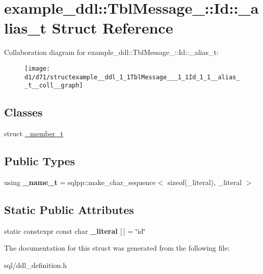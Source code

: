 \hypertarget{structexample__ddl_1_1TblMessage___1_1Id_1_1__alias__t}{}\section{example\+\_\+ddl\+:\+:Tbl\+Message\+\_\+\+:\+:Id\+:\+:\+\_\+alias\+\_\+t Struct Reference}
\label{structexample__ddl_1_1TblMessage___1_1Id_1_1__alias__t}


Collaboration diagram for example\+\_\+ddl\+:\+:Tbl\+Message\+\_\+\+:\+:Id\+:\+:\+\_\+alias\+\_\+t\+:
\nopagebreak
\begin{figure}[H]
\begin{center}
\leavevmode
\texttt{[image: d1/d71/structexample\_\_ddl\_1\_1TblMessage\_\_\_1\_1Id\_1\_1\_\_alias\_\_t\_\_coll\_\_graph]}
\end{center}
\end{figure}
\subsection*{Classes}
\begin{DoxyCompactItemize}
\item 
struct \hyperlink{structexample__ddl_1_1TblMessage___1_1Id_1_1__alias__t_1_1__member__t}{\+\_\+member\+\_\+t}
\end{DoxyCompactItemize}
\subsection*{Public Types}
\begin{DoxyCompactItemize}
\item 
\hypertarget{structexample__ddl_1_1TblMessage___1_1Id_1_1__alias__t_a7e476aec0631ba979110d3fe06055aec}{}using {\bfseries \+\_\+name\+\_\+t} = sqlpp\+::make\+\_\+char\+\_\+sequence$<$ sizeof(\+\_\+literal), \+\_\+literal $>$\label{structexample__ddl_1_1TblMessage___1_1Id_1_1__alias__t_a7e476aec0631ba979110d3fe06055aec}

\end{DoxyCompactItemize}
\subsection*{Static Public Attributes}
\begin{DoxyCompactItemize}
\item 
\hypertarget{structexample__ddl_1_1TblMessage___1_1Id_1_1__alias__t_a97665c2183a59b153d12c4b28d0a354c}{}static constexpr const char {\bfseries \+\_\+literal} \mbox{[}$\,$\mbox{]} = \char`\"{}id\char`\"{}\label{structexample__ddl_1_1TblMessage___1_1Id_1_1__alias__t_a97665c2183a59b153d12c4b28d0a354c}

\end{DoxyCompactItemize}


The documentation for this struct was generated from the following file\+:\begin{DoxyCompactItemize}
\item 
sql/ddl\+\_\+definition.\+h\end{DoxyCompactItemize}
